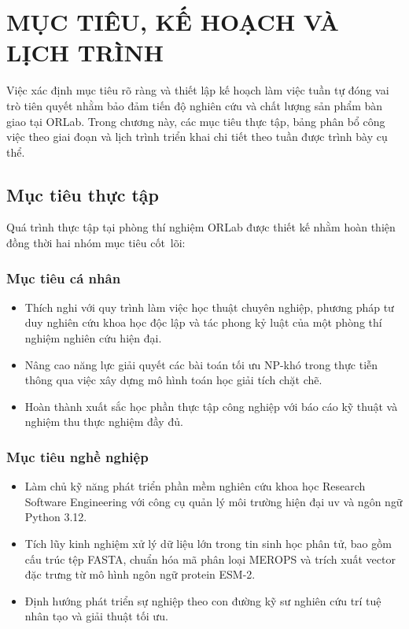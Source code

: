 \chapter{MỤC TIÊU, KẾ HOẠCH VÀ LỊCH TRÌNH}
\label{chap:ke_hoach_lich_trinh}

Việc xác định mục tiêu rõ ràng và thiết lập kế hoạch làm việc tuần tự đóng vai trò tiên quyết nhằm bảo đảm tiến độ nghiên cứu và chất lượng sản phẩm bàn giao tại ORLab. Trong chương này, các mục tiêu thực tập, bảng phân bổ công việc theo giai đoạn và lịch trình triển khai chi tiết theo tuần được trình bày cụ thể.

\section{Mục tiêu thực tập}
\label{sec:muc_tieu_thuc_tap}

Quá trình thực tập tại phòng thí nghiệm ORLab được thiết kế nhằm hoàn thiện đồng thời hai nhóm mục tiêu cốt~lõi:

\subsection{Mục tiêu cá nhân}
\begin{itemize}[noitemsep,topsep=2pt]
    \item Thích nghi với quy trình làm việc học thuật chuyên nghiệp, phương pháp tư duy nghiên cứu khoa học độc lập và tác phong kỷ luật của một phòng thí nghiệm nghiên cứu hiện đại.
    \item Nâng cao năng lực giải quyết các bài toán tối ưu NP-khó trong thực tiễn thông qua việc xây dựng mô hình toán học giải tích chặt chẽ.
    \item Hoàn thành xuất sắc học phần thực tập công nghiệp với báo cáo kỹ thuật và nghiệm thu thực nghiệm đầy đủ.
\end{itemize}

\subsection{Mục tiêu nghề nghiệp}
\begin{itemize}[noitemsep,topsep=2pt]
    \item Làm chủ kỹ năng phát triển phần mềm nghiên cứu khoa học Research Software Engineering với công cụ quản lý môi trường hiện đại uv và ngôn ngữ Python 3.12.
    \item Tích lũy kinh nghiệm xử lý dữ liệu lớn trong tin sinh học phân tử, bao gồm cấu trúc tệp FASTA, chuẩn hóa mã phân loại MEROPS và trích xuất vector đặc trưng từ mô hình ngôn ngữ protein ESM-2.
    \item Định hướng phát triển sự nghiệp theo con đường kỹ sư nghiên cứu trí tuệ nhân tạo và giải thuật tối ưu.
\end{itemize}

